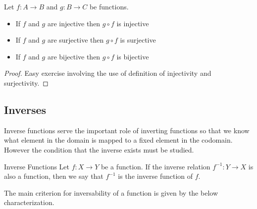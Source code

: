 \begin{prp}{}{} Let $f:A\to B$ and $g:B\to C$ be functions. 
\begin{itemize}
\item If $f$ and $g$ are injective then $g\circ f$ is injective
\item If $f$ and $g$ are surjective then $g\circ f$ is surjective
\item If $f$ and $g$ are bijective then $g\circ f$ is bijective
\end{itemize}\tcbline
\begin{proof}
Easy exercise involving the use of definition of injectivity and surjectivity. 
\end{proof}
\end{prp}

\subsection{Inverses}
Inverse functions serve the important role of inverting functions so that we know what element in the domain is mapped to a fixed element in the codomain. However the condition that the inverse exists must be studied. 

\begin{defn}{Inverse Functions}{} Let $f:X\to Y$ be a function. If the inverse relation $f^{-1}:Y\to X$ is also a function, then we say that $f^{-1}$ is the inverse function of $f$. 
\end{defn}

The main criterion for inversability of a function is given by the below characterization. 

